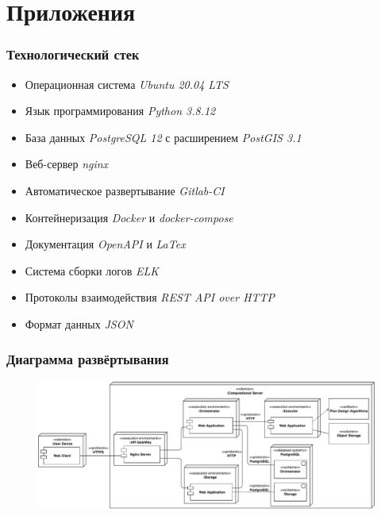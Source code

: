\appendix
\section{Приложения}

\begin{frame}
\frametitle{Технологический стек}
\begin{itemize}
    \item Операционная система \textit{Ubuntu 20.04 LTS}
    \item Язык программирования \textit{Python 3.8.12}
    \item База данных \textit{PostgreSQL 12} с расширением \textit{PostGIS 3.1}
    \item Веб-сервер \textit{nginx}
    \item Автоматическое развертывание \textit{Gitlab-CI}
    \item Контейнеризация \textit{Docker} и \textit{docker-compose}
    \item Документация \textit{OpenAPI} и \textit{LaTex}
    \item Система сборки логов \textit{ELK}
    \item Протоколы взаимодействия \textit{REST API over HTTP}
    \item Формат данных \textit{JSON}
\end{itemize}
\end{frame}

\begin{frame}
\frametitle{Диаграмма развёртывания}
\begin{figure}
    \includegraphics[scale=.49]{pictures/architecture/deployment}
\end{figure}
\end{frame}

